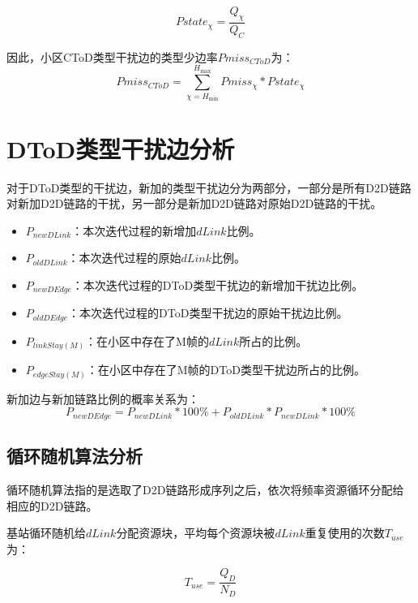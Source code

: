 \documentclass[figurelist,tablelist,algorithmlist,nomlist,masters]{seuthesix}
\begin{document}
	\begin{equation}\label{eq3.1}
	Pstate_{\chi } = \frac{{Q_{\chi }}}{{Q_C}}
	\end{equation}

	因此，小区CToD类型干扰边的类型少边率$Pmiss_{CToD}$为：
	\begin{equation}\label{eq3.1}
	Pmiss_{CToD} = \sum\limits_{\chi = {H_{\min }}}^{{H_{\max }}} Pmiss_{\chi }*Pstate_{\chi }
	\end{equation}


	\section{DToD类型干扰边分析}
	对于DToD类型的干扰边，新加的类型干扰边分为两部分，一部分是所有D2D链路对新加D2D链路的干扰，另一部分是新加D2D链路对原始D2D链路的干扰。
	\begin{itemize}
		\item ${P_{newDLink}}$：本次迭代过程的新增加$dLink$比例。
		\item ${P_{oldDLink}}$：本次迭代过程的原始$dLink$比例。
		\item ${P_{newDEdge}}$：本次迭代过程的DToD类型干扰边的新增加干扰边比例。
		\item ${P_{oldDEdge}}$：本次迭代过程的DToD类型干扰边的原始干扰边比例。
		\item ${P_{linkStay(M)}}$：在小区中存在了M帧的$dLink$所占的比例。
		\item ${P_{edgeStay(M)}}$：在小区中存在了M帧的DToD类型干扰边所占的比例。
	\end{itemize}

	新加边与新加链路比例的概率关系为：
	\begin{equation}\label{eq3.1}
	{P_{newDEdge}} = {P_{newDLink}}*100\%  + {P_{oldDLink}}*{P_{newDLink}}*100\%
	\end{equation}

	\subsection{循环随机算法分析}

	循环随机算法指的是选取了D2D链路形成序列之后，依次将频率资源循环分配给相应的D2D链路。

	基站循环随机给$dLink$分配资源块，平均每个资源块被$dLink$重复使用的次数$T_{use}$为：

	\begin{equation}\label{eq3.1}
	T_{use} = \frac{{Q_D}}{{N_D}}
	\end{equation}
\end{document}
